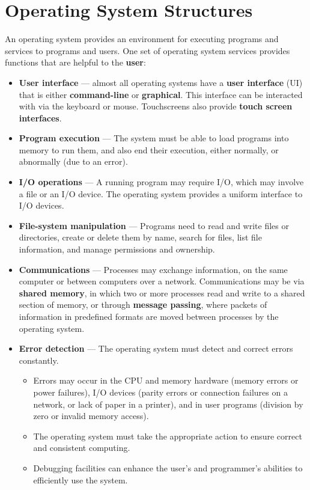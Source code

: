 \documentclass{article}
\begin{document}
\section{Operating System Structures}
An operating system provides an environment for executing programs and services to programs and users.
One set of operating system services provides functions that are helpful to the \textbf{user}:
\begin{itemize}
    \item \textbf{User interface} --- almost all operating systems have a \textbf{user interface} (UI) that is either \textbf{command-line} or \textbf{graphical}.
          This interface can be interacted with via the keyboard or mouse. Touchscreens also provide \textbf{touch screen interfaces}.
    \item \textbf{Program execution} --- The system must be able to load programs into memory to run them, and also end their execution, either normally, or abnormally (due to an error).
    \item \textbf{I/O operations} --- A running program may require I/O, which may involve a file or an I/O device. The operating system provides a uniform interface to I/O devices.
    \item \textbf{File-system manipulation} --- Programs need to read and write files or directories, create or delete them by name, search for files, list file information, and manage permissions and ownership.
    \item \textbf{Communications} --- Processes may exchange information, on the same computer or between computers over a network. Communications may be via \textbf{shared memory}, in which two or more processes read and write to a shared section of memory, or through \textbf{message passing}, where packets of information in predefined formats are moved between processes by the operating system.
    \item \textbf{Error detection} --- The operating system must detect and correct errors constantly.
          \begin{itemize}
              \item Errors may occur in the CPU and memory hardware (memory errors or power failures), I/O devices (parity errors or connection failures on a network, or lack of paper in a printer), and in user programs (division by zero or invalid memory access).
              \item The operating system must take the appropriate action to ensure correct and consistent computing.
              \item Debugging facilities can enhance the user's and programmer's abilities to efficiently use the system.
          \end{itemize}
\end{itemize}
\end{document}
